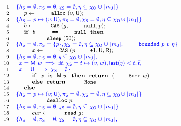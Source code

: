 {
\begin{figure}
\[
{\footnotesize{
\begin{array}{rl}
 \Num{1} & \specK{\{\heaps = \emptyset, \perms = \emptyset, \hists = \emptyset, \gist \subseteq \histo \hunion \mygather{\pending} \}}
\\ 
 \Num{2} & ~~~~ p \Asgn \esc{alloc}~(v, \Unmatched);\\
 \Num{3} & \specK{\{\heaps = p \mapsto (v; \Unmatched), \perms = \emptyset, \hists = \emptyset, \gist \subseteq \histo \hunion \mygather{\pending} \}}\\
 \Num{4} & ~~~~ b \Asgn \esc{CAS}~(g, \esc{null}, p);\\
 \Num{5} & ~~~~ \kw{if}~~b~\esc{==}~\esc{null}~~\kw{then}\\
 \Num{6} & ~~~~ ~~~~ \esc{sleep}~(50);\\
 \Num{7} & \specK{\{\heaps = \emptyset, \perms = \{p\}, \hists = \emptyset, \gist \subseteq \histo \hunion \mygather{\pending}, \esc{bounded}\ p\ v\ \gist \}}\\
 \Num{8} & ~~~~ ~~~~ x \Asgn \esc{CAS}~(p\esc{+}1, \Unmatched, \Retired);\\
 \Num{9} & \specK{\{\heaps = \emptyset, \perms = \emptyset, \gist \subseteq \histo \hunion \mygather{\pending},\hbox{}} \\
\Num{10} & \specK{\hphantom{\}}x = \Matched w \implies \exists t\ldot \hists = t \mapsto (v, w), \mathsf{last}(\gist) < t, \twin t,}\\
\Num{11} & \specK{\hphantom{\}}x = \Unmatched \implies \hists = \emptyset \}}\\
\Num{12} & ~~~~ ~~~~ \kw{if}~~x~~\kw{is}~~\Matched w~~\kw{then}~~\kw{return}~~(\esc{Some}~w)\\
\Num{13} & ~~~~ ~~~~ \kw{else}~~\kw{return}~~\esc{None}\\
\Num{14} & ~~~~ \kw{else}\\
\Num{15} & \specK{\{\heaps = p \mapsto (v; \Unmatched), \perms = \emptyset, \hists = \emptyset, \gist \subseteq \histo \hunion \mygather{\pending}\}}\\
\Num{16} & ~~~~ ~~~~ \esc{dealloc}~p;\\
\Num{17} & \specK{\{\heaps = \emptyset, \perms = \emptyset, \hists = \emptyset, \gist \subseteq \histo \hunion \mygather{\pending}\}}\\
\Num{18} & ~~~~ ~~~~ cur \Asgn \esc{read}~g;\\
\Num{19} & \specK{\{\heaps = \emptyset, \perms = \emptyset, \hists = \emptyset, \gist \subseteq \histo \hunion \mygather{\pending},}\\

\end{array}}}\]
\end{figure}}
